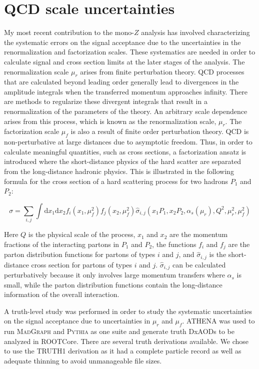 \section{QCD scale uncertainties}
\label{sec:qcd}

My most recent contribution to the mono-$Z$ analysis has involved characterizing the systematic errors on the signal acceptance due to the uncertainties in the renormalization and factorization scales. These systematics are needed in order to calculate signal and cross section limits at the later stages of the analysis. The renormalization scale $\mu_r$ arises from finite perturbation theory. QCD processes that are calculated beyond leading order generally lead to divergences in the amplitude integrals when the transferred momentum approaches infinity. There are methods to regularize these divergent integrals that result in a renormalization of the parameters of the theory. An arbitrary scale dependence arises from this process, which is known as the renormalization scale, $\mu_r$. The factorization scale $\mu_f$ is also a result of finite order perturbation theory. QCD is non-perturbative at large distances due to asymptotic freedom. Thus, in order to calculate meaningful quantities, such as cross sections, a factorization ansatz is introduced where the short-distance physics of the hard scatter are separated from the long-distance hadronic physics. This is illustrated in the following formula for the cross section of a hard scattering process for two hadrons $P_1$ and $P_2$:

\begin{equation}
\sigma = \sum_{i,j} \int \text{d}x_1 \text{d}x_2 f_{i} (x_1, \mu_f^2) f_{j} (x_2, \mu_f^2) \hat{\sigma}_{i,j} (x_1 P_1, x_2 P_2, \alpha_s(\mu_r), Q^2, \mu_r^2, \mu_f^2)
\end{equation}

\noindent Here $Q$ is the physical scale of the process, $x_1$ and $x_2$ are the momentum fractions of the interacting partons in $P_1$ and $P_2$, the functions $f_i$ and $f_j$ are the parton distribution functions for partons of types $i$ and $j$, and $\hat{\sigma}_{i,j}$ is the short-distance cross section for partons of types $i$ and $j$. $\hat{\sigma}_{i,j}$ can be calculated perturbatively because it only involves large momentum transfers where $\alpha_s$ is small, while the parton distribution functions contain the long-distance information of the overall interaction.

A truth-level study was performed in order to study the systematic uncertainties on the signal acceptance due to uncertainties in $\mu_r$ and $\mu_f$. ATHENA was used to run \textsc{MadGraph} and \textsc{Pythia} as one suite and generate truth DxAODs to be analyzed in ROOTCore. There are several truth derivations available. We chose to use the TRUTH1 derivation as it had a complete particle record as well as adequate thinning to avoid unmanageable file sizes.

